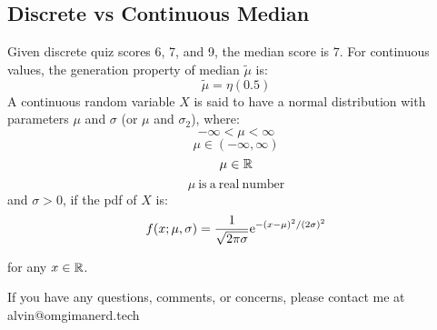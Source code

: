 \documentclass[letterpaper, 12pt]{math}
\begin{document}
\subsection*{Discrete vs Continuous Median}
Given discrete quiz scores 6, 7, and 9, the median score is 7. For continuous
values, the generation property of median \( \tilde{\mu} \) is:
\[ \tilde{\mu} = \eta(0.5) \]
A continuous random variable \( X \) is said to have a normal distribution
with parameters \( \mu \) and \( \sigma \) (or \( \mu \) and \( \sigma_{2} \)),
where:
\[ -\infty < \mu < \infty \]
\[ \mu\in(-\infty,\infty) \]
\[ \mu\in\mathbb{R} \]
\[ \mu\ \mathrm{is\ a\ real\ number} \]
and \( \sigma > 0 \), if the pdf of \( X \) is:
\[ f(x;\mu,\sigma) =
   \frac{1}{\sqrt{2\pi\sigma}}\mathrm{e}^{-(x-\mu)^{2}/(2\sigma)^{2}} \]
\begin{center}
  for any \( x\in\mathbb{R} \).
\end{center}

\begin{center}
  If you have any questions, comments, or concerns, please contact me at
  alvin@omgimanerd.tech
\end{center}
\end{document}
